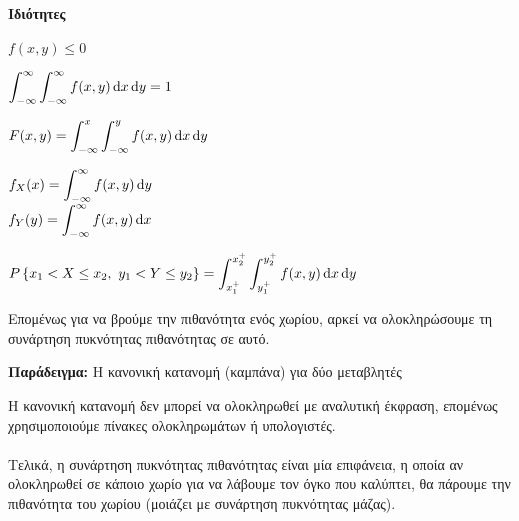 \documentclass[11pt,a4paper,notitlepage,fleqn,draft]{article}
\begin{document}
	\paragraph{Ιδιότητες}
	\begin{enumroman}
		\item \( f(x,y) \leq 0 \)
		\item \( \displaystyle
		\int_{-\infty}^{\infty} \int_{-\infty}^{\infty} f(x,y)\mathop{}\!\mathrm{d} x
		\mathop{}\!\mathrm{d} y = 1
		 \)
		\item \( \displaystyle
		F(x,y) = \int_{-\infty}^{x}\int_{-\infty}^{y} f(x,y)\mathop{}\!\mathrm{d} x\mathop{}\!\mathrm{d} y
		 \)
		\item \( \displaystyle
		f_X(x) = \int_{-\infty}^{\infty} f(x,y)\mathop{}\!\mathrm{d} y \) \\
		\( \displaystyle
		f_Y(y) = \int_{-\infty}^{\infty} f(x,y)\mathop{}\!\mathrm{d} x \)
		\item \( \displaystyle
		P\left\lbrace x_1<X\leq x_2,\ y_1<Y\leq y_2 \right\rbrace
		= \int_{x_1^+}^{x_2^+} \int_{y_1^+}^{y_2^+} f(x,y)\mathop{}\!\mathrm{d} x\mathop{}\!\mathrm{d} y
		 \)
	\end{enumroman}
	
	Επομένως για να βρούμε την πιθανότητα ενός χωρίου, αρκεί να
	ολοκληρώσουμε τη συνάρτηση πυκνότητας πιθανότητας σε αυτό.
	
	\textbf{Παράδειγμα:} Η κανονική κατανομή (καμπάνα)
	για δύο μεταβλητές
	
	
	Η κανονική κατανομή δεν μπορεί να ολοκληρωθεί με αναλυτική έκφραση,
	επομένως χρησιμοποιούμε πίνακες ολοκληρωμάτων ή υπολογιστές.
	
	\paragraph{}
	Τελικά, η συνάρτηση πυκνότητας πιθανότητας είναι μία επιφάνεια,
	η οποία αν ολοκληρωθεί σε κάποιο χωρίο για να λάβουμε τον όγκο που
	καλύπτει, θα πάρουμε την πιθανότητα του χωρίου (μοιάζει με συνάρτηση
	πυκνότητας μάζας).
	
\end{document}
